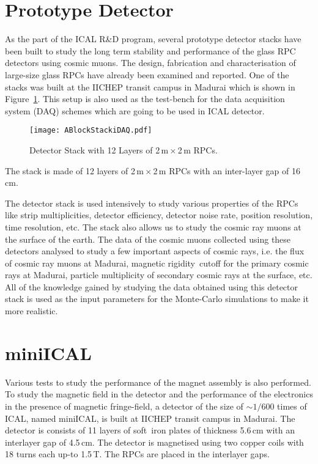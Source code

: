 \section{Prototype Detector}
As the part of the ICAL R\&D program, several prototype detector stacks have been built to study the long term stability and performance of the glass RPC detectors using cosmic muons. The design, fabrication and characterisation of large-size glass RPCs have already been examined and reported\cite{largerpc}. One of the stacks was built at the IICHEP transit campus in Madurai which is shown in Figure~\ref{fig:ablock}. This setup is also used as the test-bench for the data acquisition system (DAQ) schemes which are going to be used in ICAL detector.
\begin{figure}[h]
  \centering
  \texttt{[image: ABlockStackiDAQ.pdf]}
  \caption{Detector Stack with 12 Layers of 2\,m\,$\times$\,2\,m RPCs.}
  \label{fig:ablock}
\end{figure}
The stack is made of 12 layers of 2\,m\,$\times$\,2\,m RPCs with an inter-layer gap of 16\,cm.

The detector stack is used intensively to study various properties of the RPCs like strip multiplicities, detector efficiency, detector noise rate, position resolution, time resolution, etc. The stack also allows us to study the cosmic ray muons at the surface of the earth. The data of the cosmic muons collected using these detectors analysed to study a few important aspects of cosmic rays, i.e. the flux of cosmic ray muons at Madurai\cite{pethu1}, magnetic rigidity~cutoff for the primary cosmic rays at Madurai, particle multiplicity of secondary cosmic rays at the surface, etc. All of the knowledge gained by studying the data obtained using this detector stack is used as the input parameters for the Monte-Carlo simulations to make it more realistic.

\section{miniICAL}
Various tests to study the performance of the magnet assembly is also performed. To study the magnetic field in the detector and the performance of the electronics in the presence of magnetic fringe-field, a detector of the size of $\sim 1/600$ times of ICAL, named miniICAL, is built at IICHEP transit campus in Madurai. The detector is consists of 11 layers of soft~iron plates of thickness 5.6\,cm with an interlayer gap of 4.5\,cm. The detector is magnetised using two copper coils with 18 turns each up-to 1.5\,T. The RPCs are placed in the interlayer gaps.

